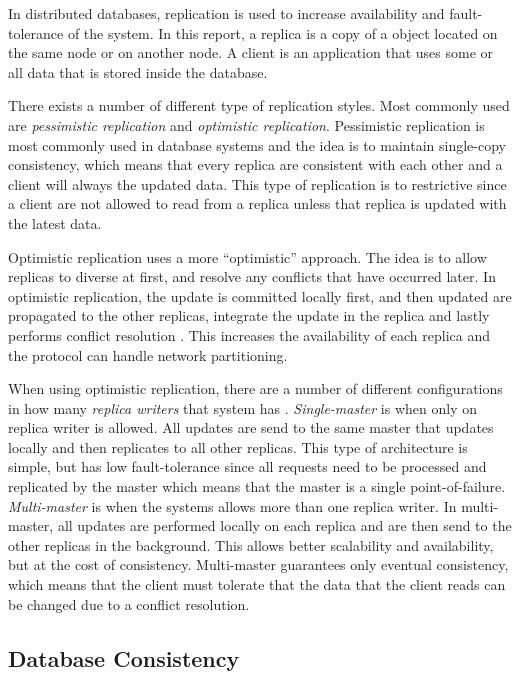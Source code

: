 In distributed databases, replication is used to increase availability and fault-tolerance of the system. In this report, a replica is a copy of a object located on the same node or on another node. A client is an application that uses some or all data that is stored inside the database. 

There exists a number of different type of replication styles. Most commonly used are \emph{pessimistic replication} and \emph{optimistic replication}. Pessimistic replication is most commonly used in database systems and the idea is to maintain single-copy consistency, which means that every replica are consistent with each other and a client will always the updated data. This type of replication is to restrictive since a client are not allowed to read from a replica unless that replica is updated with the latest data. 

Optimistic replication uses a more ``optimistic'' approach. The idea is to allow replicas to diverse at first, and resolve any conflicts that have occurred later. In optimistic replication, the update is committed locally first, and then updated are propagated to the other replicas, integrate the update in the replica and lastly performs conflict resolution \cite[]{saito2005}. This increases the availability of each replica and the protocol can handle network partitioning.

When using optimistic replication, there are a number of different configurations in how many \emph{replica writers} that system has \cite[]{saito2005}. \emph{Single-master} is when only on replica writer is allowed. All updates are send to the same master that updates locally and then replicates to all other replicas.  This type of architecture is simple, but has low fault-tolerance since all requests need to be processed and replicated by the master which means that the master is a single point-of-failure. \emph{Multi-master} is when the systems allows more than one replica writer. In multi-master, all updates are performed locally on each replica and are then send to the other replicas in the background. This allows better scalability and availability, but at the cost of consistency. Multi-master guarantees only eventual consistency, which means that the client must tolerate that the data that the client reads can be changed due to a conflict resolution.   	   


\subsection{Database Consistency} %
\label{sub:consistency}

